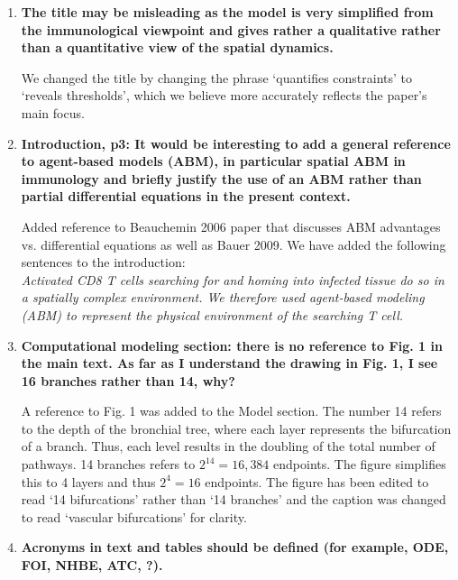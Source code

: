 \documentclass[10pt]{article}
\begin{document}
\begin{enumerate}

\item \textbf{The title may be misleading as the model is very simplified from the immunological viewpoint and gives rather a qualitative rather than a quantitative view of the spatial dynamics.}

We changed the title by changing the phrase `quantifies constraints' to `reveals thresholds', which we believe more accurately reflects the paper's main focus. \\


\item \textbf{Introduction, p3: It would be interesting to add a general reference to agent-based models (ABM), in particular spatial ABM in immunology and briefly justify the use of an ABM rather than partial differential equations in the present context.}

Added reference to Beauchemin 2006 paper that discusses ABM advantages vs. differential equations as well as Bauer 2009.  We have added the following sentences to the introduction: \\

\textit{Activated CD8 T cells searching for and homing into infected tissue do so in a spatially complex environment. We therefore used agent-based modeling (ABM) to represent the physical environment of the searching T cell.} \\

\pagebreak

\item \textbf{Computational modeling section: there is no reference to Fig. 1 in the main text. As far as I understand the drawing in Fig. 1, I see 16 branches rather than 14, why?}

A reference to Fig. 1 was added to the Model section.  The number 14 refers to the depth of the bronchial tree, where each layer represents the bifurcation of a branch.  Thus, each level results in the doubling of the total number of pathways.  14 branches refers to $2^{14} = 16,384$ endpoints.  The figure simplifies this to 4 layers and thus $2^4 = 16$ endpoints.  The figure has been edited to read `14 bifurcations' rather than `14 branches' and the caption was changed to read `vascular bifurcations' for clarity. \\


\item \textbf{Acronyms in text and tables should be defined (for example, ODE, FOI, NHBE, ATC, ?).}


\end{enumerate}
\end{document}
